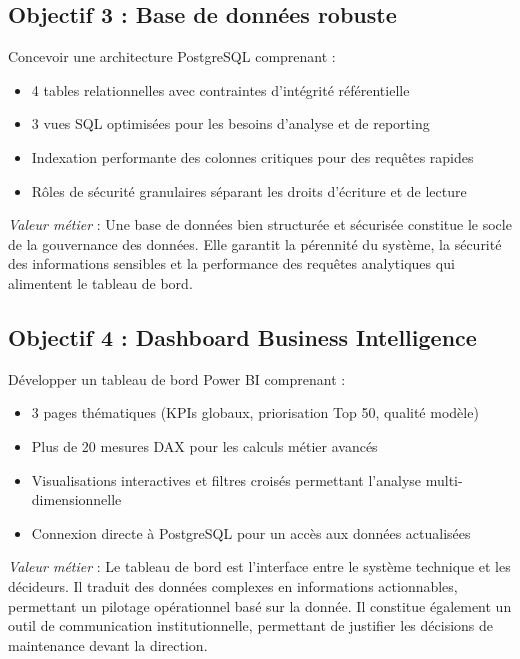\documentclass[a4paper,12pt]{report}
\begin{document}
\subsection{Objectif 3 : Base de données robuste}

Concevoir une architecture PostgreSQL comprenant :
\begin{itemize}
    \item 4 tables relationnelles avec contraintes d'intégrité référentielle
    \item 3 vues SQL optimisées pour les besoins d'analyse et de reporting
    \item Indexation performante des colonnes critiques pour des requêtes rapides
    \item Rôles de sécurité granulaires séparant les droits d'écriture et de lecture
\end{itemize}

\textit{Valeur métier} : Une base de données bien structurée et sécurisée constitue le socle de la gouvernance des données. Elle garantit la pérennité du système, la sécurité des informations sensibles et la performance des requêtes analytiques qui alimentent le tableau de bord.

\subsection{Objectif 4 : Dashboard Business Intelligence}

Développer un tableau de bord Power BI comprenant :
\begin{itemize}
    \item 3 pages thématiques (KPIs globaux, priorisation Top 50, qualité modèle)
    \item Plus de 20 mesures DAX pour les calculs métier avancés
    \item Visualisations interactives et filtres croisés permettant l'analyse multi-dimensionnelle
    \item Connexion directe à PostgreSQL pour un accès aux données actualisées
\end{itemize}

\textit{Valeur métier} : Le tableau de bord est l'interface entre le système technique et les décideurs. Il traduit des données complexes en informations actionnables, permettant un pilotage opérationnel basé sur la donnée. Il constitue également un outil de communication institutionnelle, permettant de justifier les décisions de maintenance devant la direction.
\end{document}
